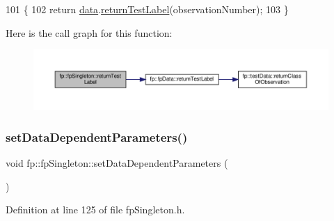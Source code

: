 \begin{DoxyCode}
101                                                              \{
102                 \textcolor{keywordflow}{return} \hyperlink{classfp_1_1fpSingleton_a2fa16ac6a0f66641749032eeee61b8e9}{data}.\hyperlink{classfp_1_1fpData_a50b6343c52560d1992de50e8cd6b1206}{returnTestLabel}(observationNumber);
103             \}
\end{DoxyCode}
Here is the call graph for this function\+:
\nopagebreak
\begin{figure}[H]
\begin{center}
\leavevmode
\includegraphics[width=350pt]{classfp_1_1fpSingleton_ac0d2a2fd5ed471c8d507dfd544c12e6d_cgraph}
\end{center}
\end{figure}
\mbox{\label{classfp_1_1fpSingleton_a3edf17209500e72c76ef816e32666eb2}} 
\subsubsection{\texorpdfstring{set\+Data\+Dependent\+Parameters()}{setDataDependentParameters()}}
{\footnotesize\ttfamily void fp\+::fp\+Singleton\+::set\+Data\+Dependent\+Parameters (\begin{DoxyParamCaption}{ }\end{DoxyParamCaption})\hspace{0.3cm}{\ttfamily [inline]}}



Definition at line 125 of file fp\+Singleton.\+h.


